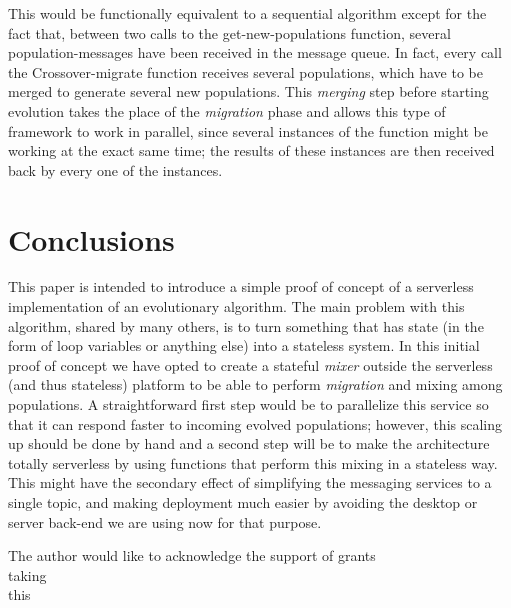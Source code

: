 \documentclass[sigconf]{acmart}
\begin{document}

This would be functionally equivalent to a sequential algorithm except
for the fact that, between two calls to the {\sf get-new-populations}
function, several
population-messages have been received in the message queue. In fact,
every call the {\sf Crossover-migrate} function receives several populations, which
have to be merged to generate several new populations. This {\em merging} step
before starting evolution takes the place of the {\em migration} phase
and allows this type of framework to work in parallel, since several
instances of the function might be working at the exact same time; the
results of these instances are then received back by every one of the
instances.



\section{Conclusions}
\label{sec:con}

This paper is intended to introduce a simple proof of concept of a
serverless implementation of an evolutionary algorithm. The main
problem with this algorithm, shared by many others, is to turn
something that has state (in the form of loop variables or anything
else) into a stateless system. In this initial proof of concept we have
opted to create a stateful {\em mixer} outside the serverless (and
thus stateless) platform to be able to perform {\em
  migration} and mixing among populations. A straightforward first step
would be to parallelize this service so that it can respond faster to
incoming evolved populations; however, this scaling up should be done
by hand and a second step will be to make the architecture totally
serverless by using functions that perform this mixing in a stateless
way. This might have the secondary effect of simplifying the messaging
services to a single topic, and making deployment much easier by
avoiding the desktop or server back-end we are using now for that
purpose.


\begin{acks}

  The author would like to acknowledge the support of grants\\
  taking\\
  this\\
\end{acks}




\end{document}
